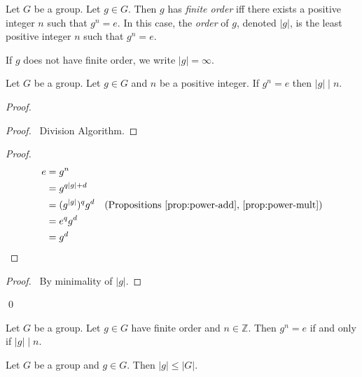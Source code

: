 \begin{df}[Order]
    Let $G$ be a group. Let $g \in G$. Then $g$ has \emph{finite order} iff there exists a positive integer $n$ such that $g^n = e$. In this case, the \emph{order} of $g$, denoted $|g|$, is the least positive integer $n$ such that $g^n = e$.

    If $g$ does not have finite order, we write $|g| = \infty$.
\end{df}

\begin{prop}
    Let $G$ be a group. Let $g \in G$ and $n$ be a positive integer. If $g^n = e$ then $|g| \mid n$.
\end{prop}

\begin{proof}
    \pf
    \begin{proof}
        \pf\ Division Algorithm.
    \end{proof}
    \begin{proof}
        \pf
        \begin{align*}
            e & = g^n                                                                                 \\
              & = g^{q|g| + d}                                                                        \\
              & = (g^{|g|})^q g^d & (\text{Propositions \ref{prop:power-add}, \ref{prop:power-mult}}) \\
              & = e^q g^d                                                                             \\
              & = g^d
        \end{align*}
    \end{proof}
    \begin{proof}
        \pf\ By minimality of $|g|$.
    \end{proof}
    \qed
\end{proof}

\begin{cor}
    \label{cor:order-divides}
    Let $G$ be a group. Let $g \in G$ have finite order and $n \in \mathbb{Z}$. Then $g^n = e$ if and only if $|g| \mid n$.
\end{cor}

\begin{prop}
    Let $G$ be a group and $g \in G$. Then $|g| \leq |G|$.
\end{prop}

